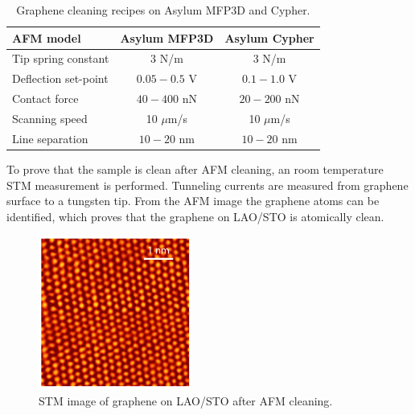 \documentclass[pdflatex, sectionletters, 12pt]{pittetd}    %
\begin{document}
\begin{table}[h!]
	\centering
	\begin{tabular}{l|cc}
		\hline
		AFM model	&	Asylum MFP3D	&	Asylum Cypher \\ \hline
		Tip spring constant	&	3 N/m	& 3 N/m	\\ 
		Deflection set-point	&	$0.05 - 0.5$ V	&	$0.1 - 1.0$ V	\\		
		Contact force	&	$40 - 400$ nN	&	$20 - 200$ nN	\\
		Scanning speed	&	10 $\mu$m/s	&	10 $\mu$m/s \\ 
		Line separation	&	$10 - 20$ nm	&	$10 - 20$ nm	\\ \hline
	\end{tabular}
	\caption{Graphene cleaning recipes on Asylum MFP3D and Cypher.}
	\label{TAB:AFMCleaning}
	
\end{table}

To prove that the sample is clean after AFM cleaning, an room temperature STM measurement is performed. Tunneling currents are measured from graphene surface to a tungsten tip. From the AFM image the graphene atoms can be identified, which proves that the graphene on LAO/STO is atomically clean. 
\\

\begin{figure}[h!]
	\centering
	\includegraphics[width=0.45\textwidth]{Drawing/GrapheneSTM.pdf}
	\caption{STM image of graphene on LAO/STO after AFM cleaning.}
	\label{FIG:GrapheneSTM}
\end{figure}


\end{document}
